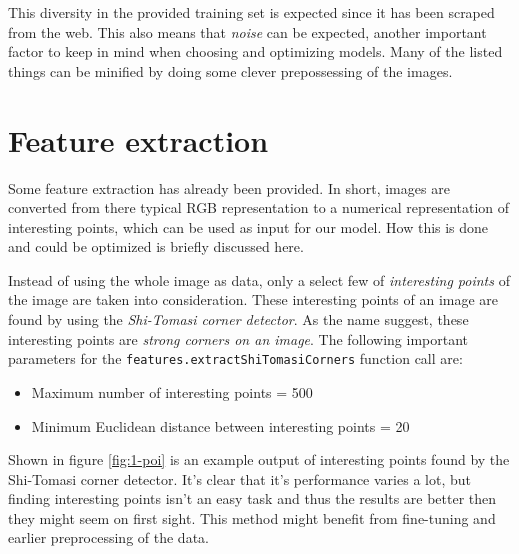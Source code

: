 This diversity in the provided training set is expected since it has been scraped from the web.
This also means that \emph{noise} can be expected, another important factor to keep in mind when choosing and optimizing models.
Many of the listed things can be minified by doing some clever prepossessing of the images.



\section{Feature extraction}
\label{section:DA_feature_extraction}

Some feature extraction has already been provided.
In short, images are converted from there typical RGB representation to a numerical representation of interesting points, which can be used as input for our model.
How this is done and could be optimized is briefly discussed here.

Instead of using the whole image as data, only a select few of \textit{interesting points} of the image are taken into consideration.
These interesting points of an image are found by using the \emph{Shi-Tomasi corner detector}.
As the name suggest, these interesting points are \textit{strong corners on an image}.
The following important parameters for the \texttt{features.extractShiTomasiCorners} function call are:
\begin{itemize}
    \item Maximum number of interesting points = 500
    \item Minimum Euclidean distance between interesting points = 20
\end{itemize}

\clearpage
Shown in figure \ref{fig:1-poi} is an example output of interesting points found by the Shi-Tomasi corner detector.
It's clear that it's performance varies a lot, but finding interesting points isn't an easy task and thus the results are better then they might seem on first sight.
This method might benefit from fine-tuning and earlier preprocessing of the data.

